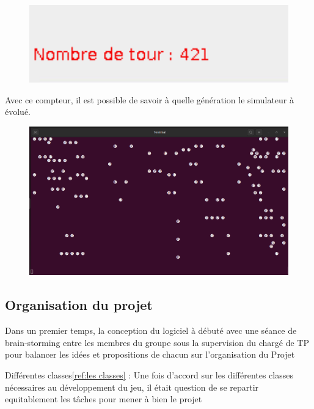 \begin{figure}
\begin{center}
    \includegraphics[width=120mm,scale=0.5]{figures/compteur.png}
\end{center}
    \end{figure}
    Avec ce compteur, il est possible de savoir à quelle génération le simulateur à évolué.
        \begin{figure}


\begin{center}
        \includegraphics[width=120mm,scale=0.5]{figures/term.png}
\end{center}
\end{figure}


\subsection{Organisation du projet}

Dans un premier temps, la conception du logiciel à débuté avec une séance de brain-storming entre les membres du groupe sous la supervision du chargé de TP pour balancer les idées et propositions de chacun sur l'organisation du Projet

Différentes classes\ref{ref:les classes} :
Une fois d'accord sur les différentes classes nécessaires au développement du jeu, il était question de se repartir equitablement les tâches pour mener à bien le projet

